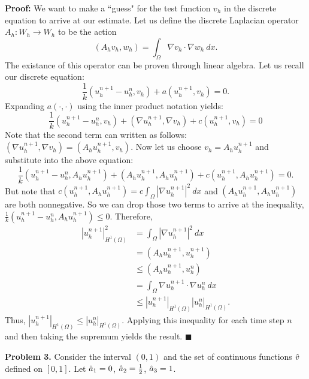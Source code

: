 \documentclass[11pt]{article}
\begin{document}
\textbf{Proof:} We want to make a ``guess" for the test function $v_h$ in the discrete equation to arrive at our estimate.
Let us define the discrete Laplacian operator $A_h : W_h \to W_h$ to be the action
\begin{equation}
    (A_hv_h,w_h) = \int_\Omega \nabla v_h \cdot \nabla w_h \:dx.
\end{equation}
The existance of this operator can be proven through linear algebra.
Let us recall our discrete equation:
\begin{equation}
    \frac{1}{k} (u^{n+1}_h - u^n_h,v_h) + a(u^{n+1}_h,v_h) = 0.
\end{equation}
Expanding $a(\cdot, \cdot)$ using the inner product notation yields:
\begin{equation}
    \frac{1}{k} (u^{n+1}_h - u^n_h,v_h) + (\nabla u^{n+1}_h,\nabla v_h) + c(u^{n+1}_h, v_h) = 0
\end{equation}
Note that the second term can written as follows: $(\nabla u^{n+1}_h,\nabla v_h) =  (A_h u^{n+1}_h, v_h)$.
Now let us choose $v_h = A_h u^{n+1}_h$ and substitute into the above equation:
\begin{equation}
    \frac{1}{k} (u^{n+1}_h - u^n_h,A_h u^{n+1}_h) + (A_h u^{n+1}_h, A_h u^{n+1}_h) + c(u^{n+1}_h, A_h u^{n+1}_h) = 0.
\end{equation}
But note that $c(u^{n+1}_h, A_h u^{n+1}_h) = c\int_\Omega |\nabla u^{n+1}_h|^2 \: dx$ and $(A_h u^{n+1}_h, A_h u^{n+1}_h)$ are both nonnegative.
So we can drop those two terms to arrive at the inequality, $\frac{1}{k} (u^{n+1}_h - u^n_h,A_h u^{n+1}_h) \leq 0$.
Therefore,
\begin{align*}
    |u^{n+1}_h|^2_{H^1(\Omega)} &= \int_\Omega |\nabla u^{n+1}_h|^2 \: dx \\
    &= (A_h u_h^{n+1}, u^{n+1}_h) \\
    &\leq (A_h u_h^{n+1}, u^n_h) \\
    &= \int_\Omega \nabla u^{n+1}_h \cdot \nabla u^n_h \: dx \\
    &\leq |u^{n+1}_h|_{H^1(\Omega)} |u^n_h|_{H^1(\Omega)}.
\end{align*}
Thus, $|u^{n+1}_h|_{H^1(\Omega)} \leq |u^n_h|_{H^1(\Omega)}$.
Applying this inequality for each time step $n$ and then taking the supremum yields the result.
$\blacksquare$




\vskip 2cm




\textbf{Problem 3.} Consider the interval $(0,1)$ and the set of continuous functions $\Hat{v}$ defined on $[0,1]$. 
Let $\Hat{a}_1 = 0$, $\Hat{a}_2 = \frac{1}{2}$, $\Hat{a}_3 = 1$.
\end{document}
